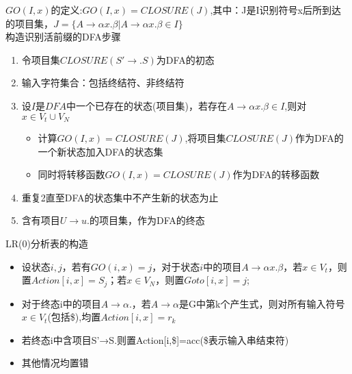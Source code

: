 \documentclass[utf8]{ctexart}
\begin{document}
$GO(I,x)$的定义:$GO(I,x)=CLOSURE(J)$,其中：J是I识别符号x后所到达的项目集，$J=\{A \rightarrow \alpha x.\beta|A \rightarrow \alpha x. \beta \in I\}$
\\

\noindent 构造识别活前缀的DFA步骤
\begin{enumerate}
    \item 令项目集$CLOSURE({S'\rightarrow .S})$为DFA的初态
    \item 输入字符集合：包括终结符、非终结符
    \item 设$I$是$DFA$中一个已存在的状态(项目集)，若存在$A\rightarrow \alpha x. \beta \in I$,则对$x \in V_t \cup V_N$
    \begin{itemize}
        \item 计算$GO(I,x)=CLOSURE(J)$,将项目集$CLOSURE(J)$作为DFA的一个新状态加入DFA的状态集
        \item 同时将转移函数$GO(I,x)=CLOSURE(J)$作为DFA的转移函数
    \end{itemize}
    \item 重复2直至DFA的状态集中不产生新的状态为止
    \item 含有项目$U \rightarrow u.$的项目集，作为DFA的终态
\end{enumerate}


\noindent LR(0)分析表的构造
\begin{itemize}
    \item 设状态$i,j$，若有$GO(i,x)=j$，对于状态$i$中的项目$A \rightarrow \alpha x.\beta$，若$x\in V_t$，则置$Action[i,x]=S_j$；若$x \in V_N$，则置$Goto[i,x]=j$;
    \item 对于终态i中的项目$A \rightarrow \alpha$.，若$A \rightarrow \alpha $是G中第k个产生式，则对所有输入符号$x \in V_t$(包括\$),均置$Action[i,x]=r_k$
    \item 若终态i中含项目S'→S.则置Action[i,\$]=acc(\$表示输入串结束符)
    \item 其他情况均置错
\end{itemize}
\end{document}
